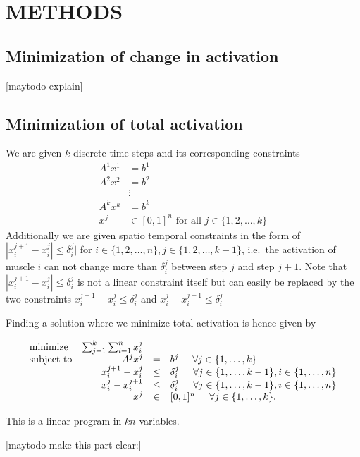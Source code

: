 \section{METHODS}
\subsection{Minimization of change in activation} %
\label{sub:minimization_of_change_in_activation}
[maytodo explain]
\subsection{Minimization of total activation} %
We are given $k$ discrete time steps and its corresponding constraints
\begin{align*}
A^1 x^1 &= b^1 \\
A^2 x^2 &= b^2 \\
 &\vdots \\
A^k x^k &= b^k \\
x^j &\in [0,1]^n \text{ for all } j \in \{1,2,\dots,k\} 
\end{align*}
Additionally we are given spatio temporal constraints in the form of $|x_i^{j+1} - x_i^{j}| \leq \delta_i^j|$ for $i \in \{1,2,\dots,n\}, j \in \{1,2,\dots,k-1\}$, i.e.\ the activation of muscle $i$ can not change more than $\delta_i^j$ between step $j$ and step $j+1$. Note that $|x_i^{j+1} - x_i^{j}| \leq \delta_i^j$ is not a linear constraint itself but can easily be replaced by the two constraints $x_i^{j+1} - x_i^{j} \leq \delta_i^j$ and $x_i^{j} - x_i^{j+1} \leq \delta_i^j$

Finding a solution where we minimize total activation is hence given by

\begin{equation}
\begin{array}{lrcl}
\mbox{minimize} & \sum_{j=1}^k \sum_{i=1}^n x_i^j \\ 
\mbox{subject to} & A^j x^j &=& b^j \hspace{5mm} \forall j \in \{1,\dots, k\} \\
  & x_i^{j+1} - x_i^{j} &\leq& \delta_i^j  \hspace{5mm} \forall j \in \{1,\dots, k-1\}, i \in \{1,\dots,n\} \\
  & x_i^{j} - x_i^{j+1} &\leq& \delta_i^j  \hspace{5mm} \forall j \in \{1,\dots, k-1\}, i \in \{1,\dots,n\} \\
  & x^j &\in& [0,1]^n \hspace{5mm} \forall j \in \{1,\dots, k\}.
\end{array}
\end{equation}

This is a linear program in $kn$ variables.

[maytodo make this part clear:]
